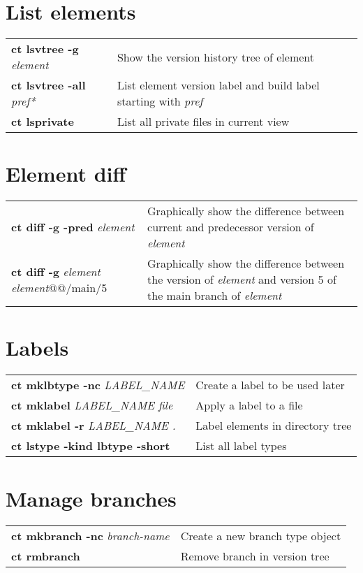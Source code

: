 \documentclass[10pt,twocolumn]{article}
\begin{document}
\section*{List elements}
\begin{tabularx}{10.2cm}{l|X}
  \textbf{ct lsvtree -g} \textit{element}    & Show the version history tree of element \\
  \textbf{ct lsvtree -all} \textit{pref*} & List element version label and build label starting with \textit{pref}\\
  \textbf{ct lsprivate}                   & List all private files in current view \\
\end{tabularx}

\section*{Element diff}
\begin{tabularx}{10.2cm}{>{\hsize=4.6cm}X|>{\hsize=4.7cm}X}
  \textbf{ct diff -g -pred} \textit{element}            & Graphically show the difference between current and predecessor version of \textit{element} \\ 
  \textbf{ct diff -g} \textit{element element}@@/main/5 & Graphically show the difference between the version of \textit{element} and version 5 of the main branch of \textit{element} \\
\end{tabularx}

\section*{Labels}
\begin{tabularx}{10.2cm}{l|X}
  \textbf{ct mklbtype -nc} \textit{LABEL\_NAME} & Create a label to be used later \\
 \textbf{ct mklabel} \textit{LABEL\_NAME file} & Apply a label to a file \\
 \textbf{ct mklabel -r} \textit{LABEL\_NAME .} & Label elements in directory tree \\
 \textbf{ct lstype -kind lbtype -short} & List all label types \\
\end{tabularx}

\section*{Manage branches}
\begin{tabularx}{10.2cm}{l|X}
 \textbf{ct mkbranch -nc} \textit{branch-name} & Create a new branch type object  \\ 
 \textbf{ct rmbranch} & Remove branch in version tree \\
\end{tabularx}
\end{document}
